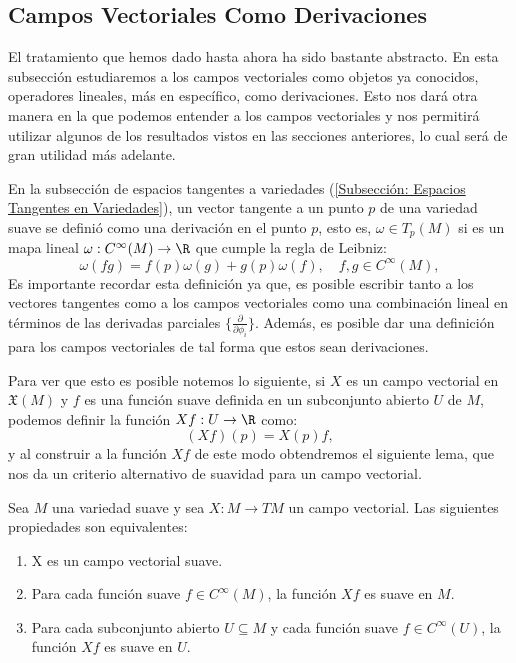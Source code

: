 \subsection{Campos Vectoriales Como Derivaciones}\label{Subsección: Campos Vectoriales Como Derivaciones}

El tratamiento que hemos dado hasta ahora ha sido bastante abstracto. En esta subsección estudiaremos a los campos vectoriales como objetos ya conocidos, operadores lineales, más en específico, como derivaciones. Esto nos dará otra manera en la que podemos entender a los campos vectoriales y nos permitirá utilizar algunos de los resultados vistos en las secciones anteriores, lo cual será de gran utilidad más adelante.

En la subsección de espacios tangentes a variedades (\ref{Subsección: Espacios Tangentes en Variedades}), un vector tangente a un punto $p$ de una variedad suave se definió como una derivación en el punto $p$, esto es, $\omega \in T_p(M)$ si es un mapa lineal $\omega: C^{\infty}(M) \to \R$ que cumple la regla de Leibniz:
\[
	\omega(fg) = f(p)\omega(g) + g(p) \omega(f), \quad f,g \in C^{\infty}(M),
\]
Es importante recordar esta definición ya que, es posible escribir tanto a los vectores tangentes como a los campos vectoriales como una combinación lineal en términos de las derivadas parciales $\{\frac{\partial}{\partial \phi_i}\}$. Además, es posible dar una definición para los campos vectoriales de tal forma que estos sean derivaciones.

Para ver que esto es posible notemos lo siguiente, si $X$ es un campo vectorial en $\mathfrak{X}(M)$ y $f$ es una función suave definida en un subconjunto abierto $U$ de $M$, podemos definir la función $Xf: U \to \R$ como:
\[
	(Xf)(p) = X(p)f,
\]
y al construir a la función $Xf$ de este modo obtendremos el siguiente lema, que nos da un criterio alternativo de suavidad para un campo vectorial.

\begin{lemma}\label{Lemma: Más Criterios de Suavidad Para Campos Vectoriales}
	Sea $M$ una variedad suave y sea $X:M \to TM$ un campo vectorial. Las siguientes propiedades son equivalentes:
	\begin{enumerate}
		\item X es un campo vectorial suave.
		\item Para cada función suave $f \in C^{\infty}(M)$, la función $Xf$ es suave en $M$.
		\item Para cada subconjunto abierto $U \subseteq M$ y cada función suave $f \in C^{\infty}(U)$, la función $Xf$ es suave en $U$.
	\end{enumerate}
\end{lemma}


